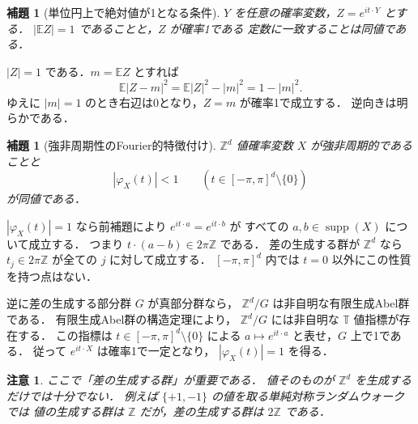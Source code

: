 \documentclass[a5paper,10pt,onecolumn]{jsarticle}
\makeatletter
\theoremstyle{mathnotetheorem}
\newtheorem{lemma}[theorem]{補題}
\newtheorem{remark}[theorem]{注意}
\renewcommand{\proofname}{証明}
\renewenvironment{proof}[1][\proofname]{%
  \par\pushQED{\qed}\normalfont\topsep4\p@\@plus2\p@\relax
  \trivlist\item[\hskip\labelsep\bfseries #1]\ignorespaces
}{\popQED\endtrivlist\@endpefalse}
\makeatother
\begin{document}
\begin{lemma}[単位円上で絶対値が1となる条件]\label{lem:unit}
$Y$ を任意の確率変数，$Z=e^{it\cdot Y}$ とする．
$|\mathbb EZ|=1$ であることと，$Z$ が確率1である
定数に一致することは同値である．
\end{lemma}
\begin{proof}
$|Z|=1$ である．$m=\mathbb EZ$ とすれば
\[
 \mathbb E|Z-m|^2=\mathbb E|Z|^2-|m|^2=1-|m|^2.
\]
ゆえに $|m|=1$ のとき右辺は0となり，$Z=m$ が確率1で成立する．
逆向きは明らかである．
\end{proof}

\begin{lemma}[強非周期性のFourier的特徴付け]\label{lem:period}
$\mathbb Z^d$ 値確率変数 $X$ が強非周期的であることと
\[
 |\varphi_X(t)|<1\qquad
  (t\in[-\pi,\pi]^d\setminus\{0\})
\]
が同値である．
\end{lemma}
\begin{proof}
$|\varphi_X(t)|=1$ なら前補題により
$e^{it\cdot a}=e^{it\cdot b}$ が
すべての $a,b\in\operatorname{supp}(X)$ について成立する．
つまり $t\cdot(a-b)\in2\pi\mathbb Z$ である．
差の生成する群が $\mathbb Z^d$ なら
$t_j\in2\pi\mathbb Z$ が全ての $j$ に対して成立する．
$[-\pi,\pi]^d$ 内では $t=0$ 以外にこの性質を持つ点はない．

逆に差の生成する部分群 $G$ が真部分群なら，
$\mathbb Z^d/G$ は非自明な有限生成Abel群である．
有限生成Abel群の構造定理により，
$\mathbb Z^d/G$ には非自明な $\mathbb T$ 値指標が存在する．
この指標は $t\in[-\pi,\pi]^d\setminus\{0\}$ による
$a\mapsto e^{it\cdot a}$ と表せ，$G$ 上で1である．
従って $e^{it\cdot X}$ は確率1で一定となり，
$|\varphi_X(t)|=1$ を得る．
\end{proof}

\begin{remark}
ここで「差の生成する群」が重要である．
値そのものが $\mathbb Z^d$ を生成するだけでは十分でない．
例えば $\{+1,-1\}$ の値を取る単純対称ランダムウォークでは
値の生成する群は $\mathbb Z$ だが，差の生成する群は
$2\mathbb Z$ である．
\end{remark}
\end{document}

